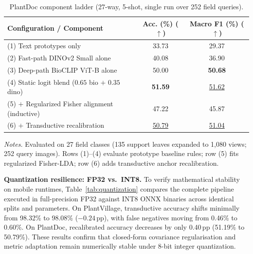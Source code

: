 \documentclass[preprint,12pt]{elsarticle}
\begin{document}
\begin{table}[htbp]
\caption{PlantDoc component ladder (27-way, 5-shot, single run over 252 field queries).}
\label{tab:plantdoc_ablation}
\centering

\footnotesize
\setlength{\tabcolsep}{3pt}
\begin{tabular*}{\columnwidth}{@{\extracolsep{\fill}}lcc}
\toprule
\textbf{Configuration / Component} & \textbf{Acc. (\%) ($\uparrow$)} & \textbf{Macro F1 (\%) ($\uparrow$)} \\
\midrule
(1) Text prototypes only & 33.73 & 29.37 \\
(2) Fast-path DINOv2 Small alone & 40.08 & 36.90 \\
(3) Deep-path BioCLIP ViT-B alone & 50.00 & \textbf{50.68} \\
(4) Static logit blend ($0.65$ bio $+$ $0.35$ dino) & \textbf{51.59} & \underline{51.62} \\
(5) $+$ Regularized Fisher alignment (inductive) & 47.22 & 45.87 \\
(6) $+$ Transductive recalibration & \underline{50.79} & \underline{51.04} \\
\bottomrule
\end{tabular*}

\vspace{3pt}
\begin{minipage}{\columnwidth}
\footnotesize
\textit{Notes.} Evaluated on 27 field classes (135 support leaves expanded to 1{,}080 views; 252 query images). Rows (1)--(4) evaluate prototype baseline rules; row (5) fits regularized Fisher-LDA; row (6) adds transductive anchor recalibration.
\end{minipage}
\end{table}

\textbf{Quantization resilience: FP32 vs.\ INT8.} To verify mathematical stability on mobile runtimes, Table~\ref{tab:quantization} compares the complete pipeline executed in full-precision FP32 against INT8 ONNX binaries across identical splits and parameters. On PlantVillage, transductive accuracy shifts minimally from 98.32\% to 98.08\% ($-0.24$\,pp), with false negatives moving from 0.46\% to 0.60\%. On PlantDoc, recalibrated accuracy decreases by only 0.40\,pp (51.19\% to 50.79\%). These results confirm that closed-form covariance regularisation and metric adaptation remain numerically stable under 8-bit integer quantization.
\end{document}
